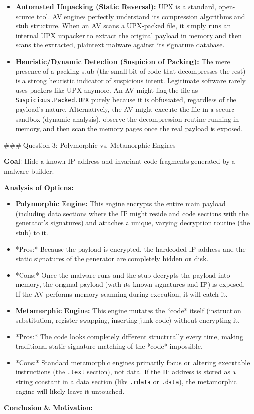 \documentclass{article}
\begin{document}
\begin{itemize}
    \item[\textbf{1.}] \textbf{Automated Unpacking (Static Reversal):} UPX is a standard, open-source tool. AV engines perfectly understand its compression algorithms and stub structure. When an AV scans a UPX-packed file, it simply runs an internal UPX unpacker to extract the original payload in memory and then scans the extracted, plaintext malware against its signature database.
    \item[\textbf{2.}] \textbf{Heuristic/Dynamic Detection (Suspicion of Packing):} The mere presence of a packing stub (the small bit of code that decompresses the rest) is a strong heuristic indicator of suspicious intent. Legitimate software rarely uses packers like UPX anymore. An AV might flag the file as \texttt{Suspicious.Packed.UPX} purely because it is obfuscated, regardless of the payload's nature. Alternatively, the AV might execute the file in a secure sandbox (dynamic analysis), observe the decompression routine running in memory, and then scan the memory pages once the real payload is exposed.

\end{itemize}
\#\#\# Question 3: Polymorphic vs. Metamorphic Engines

\textbf{Goal:} Hide a known IP address and invariant code fragments generated by a malware builder.

\textbf{Analysis of Options:}

\begin{itemize}
    \item \textbf{Polymorphic Engine:} This engine encrypts the entire main payload (including data sections where the IP might reside and code sections with the generator's signatures) and attaches a unique, varying decryption routine (the stub) to it.
    \item *Pros:* Because the payload is encrypted, the hardcoded IP address and the static signatures of the generator are completely hidden on disk.
    \item *Cons:* Once the malware runs and the stub decrypts the payload into memory, the original payload (with its known signatures and IP) is exposed. If the AV performs memory scanning during execution, it will catch it.

    \item \textbf{Metamorphic Engine:} This engine mutates the *code* itself (instruction substitution, register swapping, inserting junk code) without encrypting it.
    \item *Pros:* The code looks completely different structurally every time, making traditional static signature matching of the *code* impossible.
    \item *Cons:* Standard metamorphic engines primarily focus on altering executable instructions (the \texttt{.text} section), not data. If the IP address is stored as a string constant in a data section (like \texttt{.rdata} or \texttt{.data}), the metamorphic engine will likely leave it untouched.

\end{itemize}
\textbf{Conclusion \& Motivation:}
\end{document}
